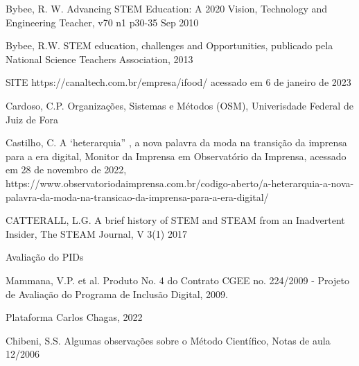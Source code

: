 \begin{flushleft}
[BYBEE, 2010] Bybee, R. W. Advancing STEM Education: A 2020 Vision, Technology and Engineering Teacher, v70 n1 p30-35 Sep 2010
\end{flushleft}


\begin{flushleft}
[BYBEE, 2013] Bybee, R.W. STEM education, challenges and Opportunities, publicado pela National Science Teachers Association, 2013
\end{flushleft}


\begin{flushleft}
[CANALTECH, 2022] SITE https://canaltech.com.br/empresa/ifood/ acessado em 6 de janeiro de 2023
\end{flushleft}


\begin{flushleft}
[CARDOSO, 2014] Cardoso, C.P. Organizações, Sistemas e Métodos (OSM), Univerisdade Federal de Juiz de Fora
\end{flushleft}


\begin{flushleft}
[CASTILHO, 2008] Castilho, C. A ‘heterarquia” , a nova palavra da moda na transição da imprensa para a era digital, Monitor da Imprensa em Observatório da Imprensa, acessado em 28 de novembro de 2022, https://www.observatoriodaimprensa.com.br/codigo-aberto/a-heterarquia-a-nova-palavra-da-moda-na-transicao-da-imprensa-para-a-era-digital/
\end{flushleft}


\begin{flushleft}
[CATTERALL, 2017] CATTERALL, L.G. A brief history of STEM and STEAM from an Inadvertent Insider, The STEAM Journal, V 3(1) 2017
\end{flushleft}


\begin{flushleft}
[CGEE, 2010] Avaliação do PIDs
\end{flushleft}


\begin{flushleft}
[CGEE, 2010a] Mammana, V.P. et al. Produto No. 4 do Contrato CGEE no. 224/2009 - Projeto de Avaliação do Programa de Inclusão Digital, 2009.
\end{flushleft}


\begin{flushleft}
[CHAGAS, 2022] Plataforma Carlos Chagas, 2022
\end{flushleft}


\begin{flushleft}
[CHIBENI, 2006] Chibeni, S.S. Algumas observações sobre o Método Científico, Notas de aula 12/2006
\end{flushleft}


